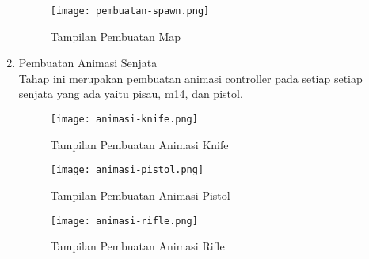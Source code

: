 \begin{enumerate}
\begin{figure}[h]
    \centering
    \texttt{[image: pembuatan-spawn.png]}
    \caption{Tampilan Pembuatan Map}
    \label{fig:pembuatanspawn}
\end{figure}
\item Pembuatan Animasi Senjata \\
Tahap ini merupakan pembuatan animasi controller pada setiap setiap senjata yang ada yaitu pisau, m14, dan pistol.
\begin{figure}[h]
    \centering
    \texttt{[image: animasi-knife.png]}
    \caption{Tampilan Pembuatan Animasi Knife}
    \label{fig:animasiknife}
\end{figure}
\newpage
\begin{figure}[h]
    \centering
    \texttt{[image: animasi-pistol.png]}
    \caption{Tampilan Pembuatan Animasi Pistol}
    \label{fig:animasipistol}
\end{figure}
\begin{figure}[h]
    \centering
    \texttt{[image: animasi-rifle.png]}
    \caption{Tampilan Pembuatan Animasi Rifle}
    \label{fig:animasirifle}
\end{figure}
\end{enumerate}



